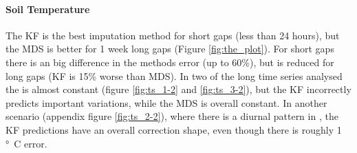 \documentclass{article}
\begin{document}
\paragraph{Soil Temperature} The KF is the best imputation method for short gaps (less than 24 hours), but the MDS is better for 1 week long gaps (Figure \ref{fig:the_plot}). For short gaps there is an big difference in the methods error (up to 60\%), but is reduced for long gaps (KF is 15\% worse than MDS). In two of the long time series analysed the  is almost constant (figure \ref{fig:ts_1-2} and \ref{fig:ts_3-2}), but the KF incorrectly predicts important variations, while the MDS is overall constant. In another scenario (appendix figure \ref{fig:ts_2-2}), where there is a diurnal pattern in , the KF predictions have an overall correction shape, even though there is roughly 1 \si{°C} error.
\end{document}
